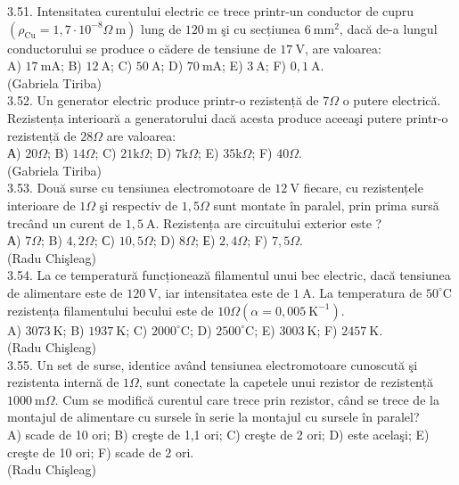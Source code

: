 \documentclass[10pt]{article}
\begin{document}
3.51. Intensitatea curentului electric ce trece printr-un conductor de cupru $\left(\rho_{\mathrm{Cu}}=1,7 \cdot 10^{-8} \Omega \mathrm{~m}\right)$ lung de $120 \mathrm{~m}$ şi cu secțiunea $6 \mathrm{~mm}^{2}$, dacă de-a lungul conductorului se produce o cădere de tensiune de $17 \mathrm{~V}$, are valoarea:\\ A) $17 \mathrm{~mA}$; B) $12 \mathrm{~A}$; C) $50 \mathrm{~A}$; D) $70 \mathrm{~mA}$; E) $3 \mathrm{~A}$; F) $0,1 \mathrm{~A}$.\\ (Gabriela Tiriba)\\

3.52. Un generator electric produce printr-o rezistență de $7 \Omega$ o putere electrică. Rezistența interioară a generatorului dacă acesta produce aceeaşi putere printr-o rezistență de $28 \Omega$ are valoarea:\\ А) $20 \Omega$; B) $14 \Omega$; C) $21 \mathrm{k} \Omega$; D) $7 \mathrm{k} \Omega$; E) $35 \mathrm{k} \Omega$; F) $40 \Omega$.\\ (Gabriela Tiriba)\\

3.53. Două surse cu tensiunea electromotoare de $12 \mathrm{~V}$ fiecare, cu rezistențele interioare de $1 \Omega$ şi respectiv de $1,5 \Omega$ sunt montate în paralel, prin prima sursă trecând un curent de $1,5 \mathrm{~A}$. Rezistența are circuitului exterior este ?\\ А) $7 \Omega$; B) $4,2 \Omega$; С) $10,5 \Omega$; D) $8 \Omega$; Е) $2,4 \Omega$; F) $7,5 \Omega$.\\ (Radu Chişleag)\\

3.54. La ce temperatură funcționează filamentul unui bec electric, dacă tensiunea de alimentare este de $120 \mathrm{~V}$, iar intensitatea este de $1 \mathrm{~A}$. La temperatura de $50^{\circ} \mathrm{C}$ rezistența filamentului becului este de $10 \Omega\left(\alpha=0,005 \mathrm{~K}^{-1}\right)$.\\ A) $3073 \mathrm{~K}$; B) $1937 \mathrm{~K}$; C) $2000^{\circ} \mathrm{C}$; D) $2500^{\circ} \mathrm{C}$; E) $3003 \mathrm{~K}$; F) $2457 \mathrm{~K}$.\\ (Radu Chişleag)\\

3.55. Un set de surse, identice având tensiunea electromotoare cunoscută şi rezistenta internă de $1 \Omega$, sunt conectate la capetele unui rezistor de rezistență $1000 \mathrm{~m} \Omega$. Cum se modifică curentul care trece prin rezistor, când se trece de la montajul de alimentare cu sursele în serie la montajul cu sursele în paralel?\\ A) scade de 10 ori; B) creşte de 1,1 ori; C) creşte de 2 ori; D) este acelaşi; E) creşte de 10 ori; F) scade de 2 ori.\\ (Radu Chişleag)\\
\end{document}
